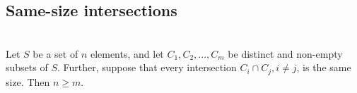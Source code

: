 \begin{comment}
\newpage
\subsection{The Clubs of Oddtown}

Oddtown has two rules about clubs:
\begin{itemize}
\item Every club must have an {\it odd} number of members.
\item The number of members in the intersection of any two distinct clubs must be {\it even}.
\end{itemize}

\begin{theorem}
  Under these rules, the number of clubs is less than the number of members.
\end{theorem}

\begin{proof}
  Let $m$ be the number of clubs and $n$ be the number of members.

  Let $A = (a_{ij})$ be a matrix over the finite field $F_2$, where $a_{ij} =
  \begin{cases}
    1 ~~~~ \text{if person $j$ is a member of club $i$},\\
    0 ~~~~ \text{otherwise}.
  \end{cases}
  $

  Thus rows correspond to clubs, and the $(i,j)$-th entry of $AA^T$ is 1 if the intersection of club
  $i$ and club $j$ is odd, and 0 if even.

  Therefore the rules imply that $AA^T = I_m$. I.e. the rank of $AA^T$ is $m$.

  But the rank of a product of matrices cannot be larger than the minimum rank of any one factor, so
  $m \leq n$.
\end{proof}

\end{comment}  %
\subsection{Same-size intersections}

\begin{theorem*}~\\
  Let $S$ be a set of $n$ elements, and let $C_1, C_2, ..., C_m$ be distinct and non-empty subsets of
  $S$. Further, suppose that every intersection $C_i \cap C_j, i \neq j$, is the same size. Then $n \geq m$.
\end{theorem*}

